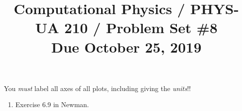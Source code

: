\documentclass[11pt, preprint]{aastex}
\begin{document}
\title{\bf Computational Physics / PHYS-UA 210 / Problem Set \#8
\\ Due October 25, 2019 }

You {\it must} label all axes of all plots, including giving the {\it
  units}!!

\begin{enumerate} 
\item Exercise 6.9 in Newman.
\end{enumerate} 
\end{document}
